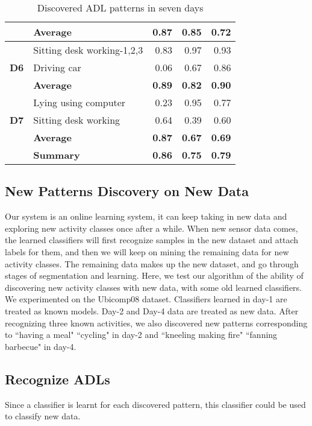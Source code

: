 \documentclass{sigchi}
\begin{document}
\begin{table}[htbp]
\begin{tabular}{llrrr}
          & \textbf{Average} & \textbf{0.87 } & \textbf{0.85 } & \textbf{0.72 } \\
          \hline
    \multirow{3}[0]{*}{\textbf{D6}} & Sitting desk working-1,2,3 & 0.83  & 0.97  & 0.93  \\
          & Driving car & 0.06  & 0.67  & 0.86  \\
          & \textbf{Average} & \textbf{0.89 } & \textbf{0.82 } & \textbf{0.90 } \\
          \hline
    \multirow{3}[0]{*}{\textbf{D7}} & Lying using computer & 0.23  & 0.95  & 0.77  \\
          & Sitting desk working & 0.64  & 0.39  & 0.60  \\
          & \textbf{Average} & \textbf{0.87 } & \textbf{0.67 } & \textbf{0.69 } \\
          \hline
    \textbf{} & \textbf{Summary} & \textbf{0.86 } & \textbf{0.75 } & \textbf{0.79 } \\
    \bottomrule
    \end{tabular}%
  \caption{Discovered ADL patterns in seven days}
  \label{tab:result-seven-days}%
\end{table}%


\subsection{New Patterns Discovery on New Data}
    \label{subsec.exp.discover-new-classes}

    Our system is an online learning system, it can keep taking in new data and exploring new activity classes once after a while.
    When new sensor data comes, the learned classifiers will first recognize samples in the new dataset and attach labels for them, and then we will keep on mining the remaining data for new activity classes.
    The remaining data makes up the new dataset, and go through stages of segmentation and learning.
    Here, we test our algorithm of the ability of discovering new activity classes with new data, with some old learned classifiers.
    We experimented on the Ubicomp08 dataset. Classifiers learned in day-1 are treated as known models. Day-2 and Day-4 data are treated as new data.
    After recognizing three known activities, we also discovered new patterns corresponding to ``having a meal" ``cycling" in day-2 and ``kneeling making fire" ``fanning barbecue" in day-4.

    \subsection{Recognize ADLs}
    \label{subsec.exp.recognize-performance}
    Since a classifier is learnt for each discovered pattern, this classifier could be used to classify new data.
    
\end{document}
